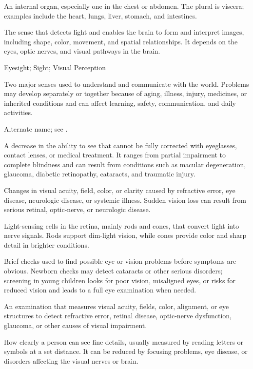  An internal organ, especially one in the chest or abdomen. The plural is viscera; examples include the heart, lungs, liver, stomach, and intestines.

 The sense that detects light and enables the brain to form and interpret images, including shape, color, movement, and spatial relationships. It depends on the eyes, optic nerves, and visual pathways in the brain.

\synonyms
Eyesight; Sight; Visual Perception

 Two major senses used to understand and communicate with the world. Problems may develop separately or together because of aging, illness, injury, medicines, or inherited conditions and can affect learning, safety, communication, and daily activities.

 Alternate name; see .

 A decrease in the ability to see that cannot be fully corrected with eyeglasses, contact
lenses, or medical treatment. It ranges from partial impairment to complete blindness
and can result from conditions such as macular degeneration, glaucoma, diabetic
retinopathy, cataracts, and traumatic injury.

 Changes in visual acuity, field, color, or clarity caused by refractive error, eye disease, neurologic disease, or systemic illness. Sudden vision loss can result from serious retinal, optic-nerve, or neurologic disease.

 Light-sensing cells in the retina, mainly rods and cones, that convert light into nerve signals. Rods support dim-light vision, while cones provide color and sharp detail in brighter conditions.

 Brief checks used to find possible eye or vision problems before symptoms are obvious. Newborn checks may detect cataracts or other serious disorders; screening in young children looks for poor vision, misaligned eyes, or risks for reduced vision and leads to a full eye examination when needed.

 An examination that measures visual acuity, fields, color, alignment, or eye structures to detect refractive error, retinal disease, optic-nerve dysfunction, glaucoma, or other causes of visual impairment.

 How clearly a person can see fine details, usually measured by reading letters or symbols at a set distance. It can be reduced by focusing problems, eye disease, or disorders affecting the visual nerves or brain.

